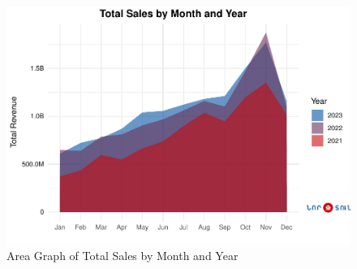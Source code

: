 \documentclass[conference]{IEEEtran}
\begin{document}
\begin{figure}[htbp]
\centering
\includegraphics[width=\columnwidth,keepaspectratio]{./figures/area_graph_sales_by_year.pdf}
\caption{Area Graph of Total Sales by Month and Year \cite{area}}
\label{fig:area-graph}
\end{figure}

\end{document}
